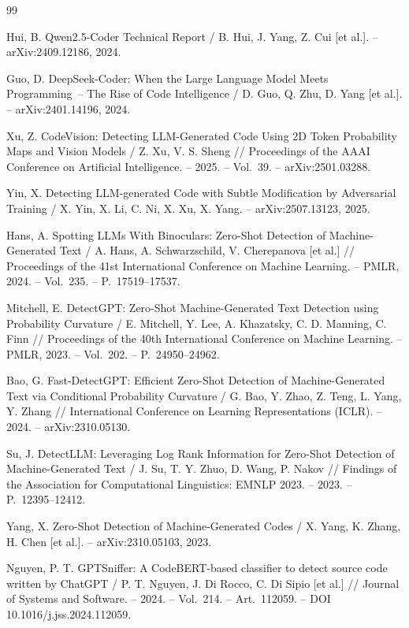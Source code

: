 \documentclass{misisarticle}
\begin{document}
\begin{thebibliography}{99}

 Hui, B. Qwen2.5-Coder Technical Report / B. Hui, J. Yang, Z. Cui [et al.]. -- arXiv:2409.12186, 2024.

 Guo, D. DeepSeek-Coder: When the Large Language Model Meets Programming~-- The Rise of Code Intelligence / D. Guo, Q. Zhu, D. Yang [et al.]. -- arXiv:2401.14196, 2024.

 Xu, Z. CodeVision: Detecting LLM-Generated Code Using 2D Token Probability Maps and Vision Models / Z. Xu, V. S. Sheng // Proceedings of the AAAI Conference on Artificial Intelligence. -- 2025. -- Vol.~39. -- arXiv:2501.03288.

 Yin, X. Detecting LLM-generated Code with Subtle Modification by Adversarial Training / X. Yin, X. Li, C. Ni, X. Xu, X. Yang. -- arXiv:2507.13123, 2025.

 Hans, A. Spotting LLMs With Binoculars: Zero-Shot Detection of Machine-Generated Text / A. Hans, A. Schwarzschild, V. Cherepanova [et al.] // Proceedings of the 41st International Conference on Machine Learning. -- PMLR, 2024. -- Vol.~235. -- P.~17519--17537.

 Mitchell, E. DetectGPT: Zero-Shot Machine-Generated Text Detection using Probability Curvature / E. Mitchell, Y. Lee, A. Khazatsky, C. D. Manning, C. Finn // Proceedings of the 40th International Conference on Machine Learning. -- PMLR, 2023. -- Vol.~202. -- P.~24950--24962.

 Bao, G. Fast-DetectGPT: Efficient Zero-Shot Detection of Machine-Generated Text via Conditional Probability Curvature / G. Bao, Y. Zhao, Z. Teng, L. Yang, Y. Zhang // International Conference on Learning Representations (ICLR). -- 2024. -- arXiv:2310.05130.

 Su, J. DetectLLM: Leveraging Log Rank Information for Zero-Shot Detection of Machine-Generated Text / J. Su, T. Y. Zhuo, D. Wang, P. Nakov // Findings of the Association for Computational Linguistics: EMNLP 2023. -- 2023. -- P.~12395--12412.

 Yang, X. Zero-Shot Detection of Machine-Generated Codes / X. Yang, K. Zhang, H. Chen [et al.]. -- arXiv:2310.05103, 2023.

 Nguyen, P. T. GPTSniffer: A CodeBERT-based classifier to detect source code written by ChatGPT / P. T. Nguyen, J. Di Rocco, C. Di Sipio [et al.] // Journal of Systems and Software. -- 2024. -- Vol.~214. -- Art.~112059. -- DOI 10.1016/j.jss.2024.112059.


\end{thebibliography}
\end{document}

